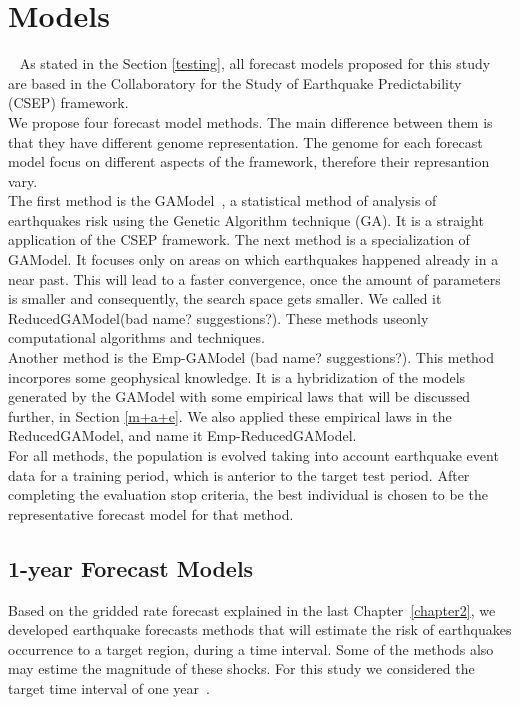 \chapter{Models}~\label{chapter3}
As stated in the Section \ref{testing}, all forecast models proposed for this study are based in the Collaboratory for the Study of Earthquake Predictability (CSEP) framework.\\

We propose four forecast model methods. The main difference between them is that they have different genome representation. The genome for each forecast model focus on different aspects of the framework, therefore their represantion vary.\\

The first method is the GAModel~\cite{ecta14}, a statistical method of analysis of
earthquakes risk using the Genetic Algorithm technique (GA). It is a straight application of the CSEP framework. The next method is a specialization of GAModel. It focuses only on areas on which earthquakes happened already in a near past. This will lead to a faster convergence, once the amount of parameters is smaller and consequently, the search space gets smaller. We called it ReducedGAModel(bad name? suggestions?). These methods useonly computational algorithms and techniques.\\

Another method is the Emp-GAModel (bad name? suggestions?). This method incorpores some
geophysical knowledge. It is a hybridization of the models generated by the GAModel with some empirical laws that will be discussed further, in Section \ref{m+a+e}. We also applied these empirical laws in the ReducedGAModel, and name it Emp-ReducedGAModel.\\

For all methods, the population is evolved taking into account earthquake event data for a training period, which is anterior to the target test period. After completing the evaluation stop criteria, the best individual is chosen to be the representative forecast model for that method.\\

\section{1-year Forecast Models}\label{1year-model}
Based on the gridded rate forecast explained in the last Chapter~\ref{chapter2}, we developed earthquake forecasts methods that will estimate the risk of earthquakes occurrence to a target region, during a time interval. Some of the methods also may estime the magnitude of these shocks. For this study we considered the target time interval of one year~\cite{ecta14}.\\

